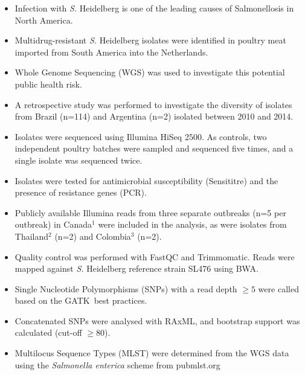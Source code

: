 \documentclass[portrait,a0paper,fontscale=0.31]{baposter}
\newcommand{\heidelberg}{\textit{S.} Heidelberg }
\newcommand{\fcite}[2]{#1$^#2$}
\newcommand{\Mdr}{Multidrug-resistant }
\newcommand{\reference}{reference strain SL476 }
\newcommand{\padd}{\vspace*{0.2cm}}
\begin{document}
\begin{poster}
   {
    \padd
    \begin{itemize}
      \item Infection with \heidelberg is one of the leading causes of Salmonellosis in North America.
      \item \Mdr \heidelberg isolates were identified in poultry meat imported from South America into the Netherlands.
      \item Whole Genome Sequencing (WGS) was used to investigate this potential public health risk.
    \end{itemize}
  }
   {
    \padd
    \begin{itemize}
      \item A retrospective study was performed to investigate the diversity of isolates from Brazil (n=114) and Argentina (n=2) isolated between 2010 and 2014.
      \item Isolates were sequenced using Illumina HiSeq 2500. As controls, two independent poultry batches were sampled and sequenced five times, and a single isolate was sequenced twice.
      \item Isolates were tested for antimicrobial susceptibility (Sensititre) and the presence of resistance genes (PCR).
      \item Publicly available Illumina reads from three separate outbreaks (n=5 per outbreak) in \fcite{Canada}{1} were included in the analysis, as were isolates from \fcite{Thailand}{2} (n=2) and \fcite{Colombia}{3} (n=2).
      \item Quality control was performed with FastQC and Trimmomatic. \!Reads were mapped against \heidelberg \reference using BWA.
      \item Single Nucleotide Polymorphisms (SNPs) with a read depth $\geq\!\!\!5$ were called based on the GATK~best practices. 
      \item Concatenated SNPs were analysed with RAxML, and bootstrap support was calculated (cut-off $\geq\!80$).
      \item Multilocus Sequence Types (MLST) were determined from the WGS data using the \textit{Salmonella enterica} scheme from pubmlst.org
    \end{itemize}
  }


\end{poster}
\end{document}
